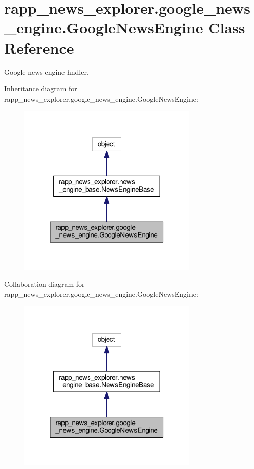 \hypertarget{classrapp__news__explorer_1_1google__news__engine_1_1GoogleNewsEngine}{\section{rapp\-\_\-news\-\_\-explorer.\-google\-\_\-news\-\_\-engine.\-Google\-News\-Engine Class Reference}
\label{classrapp__news__explorer_1_1google__news__engine_1_1GoogleNewsEngine}
}


Google news engine hndler.  




Inheritance diagram for rapp\-\_\-news\-\_\-explorer.\-google\-\_\-news\-\_\-engine.\-Google\-News\-Engine\-:
\nopagebreak
\begin{figure}[H]
\begin{center}
\leavevmode
\includegraphics[width=246pt]{classrapp__news__explorer_1_1google__news__engine_1_1GoogleNewsEngine__inherit__graph}
\end{center}
\end{figure}


Collaboration diagram for rapp\-\_\-news\-\_\-explorer.\-google\-\_\-news\-\_\-engine.\-Google\-News\-Engine\-:
\nopagebreak
\begin{figure}[H]
\begin{center}
\leavevmode
\includegraphics[width=246pt]{classrapp__news__explorer_1_1google__news__engine_1_1GoogleNewsEngine__coll__graph}
\end{center}
\end{figure}
